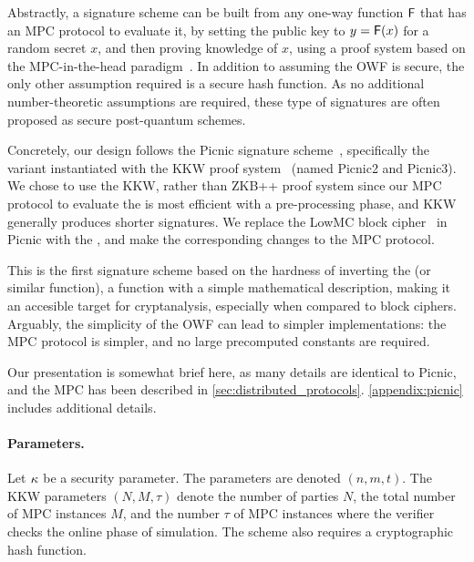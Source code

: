 Abstractly, a signature scheme can be built from any one-way function $\mathsf{F}$
that has an MPC protocol to evaluate it, by setting the public key to $y =
\mathsf{F}(x)$ for a random secret $x$, and then proving knowledge of $x$, using a
proof system based on the MPC-in-the-head paradigm~\cite{ishai2007-zkmpc}.  In
addition to assuming the OWF is secure, the only other assumption required is a
secure hash function. As no additional number-theoretic assumptions are
required, these type of signatures are often proposed as secure post-quantum
schemes. 

Concretely, our design follows the Picnic signature scheme~\cite{chase2017-picnic},
specifically the variant instantiated with the KKW proof
system~\cite{katz2018-pqsigs} (named Picnic2 and Picnic3).  We chose to use the
KKW, rather than ZKB++ proof system since our MPC protocol to evaluate the
\ttOWF is most efficient with a pre-processing phase, and KKW generally
produces shorter signatures.  We replace the LowMC block cipher~\cite{albrecht2015-lowmc} in Picnic 
with the \ttOWF, and make the corresponding changes to the MPC protocol. 

This is the first signature scheme based on the hardness of inverting the
\ttOWF (or similar function), a function with a simple mathematical
description, making it an accesible target for cryptanalysis, especially when
compared to block ciphers.  Arguably, the simplicity of the OWF can lead to
simpler implementations: the MPC protocol is simpler, and no large precomputed
constants are required. 

Our presentation is somewhat brief here, as many details are identical to Picnic, 
and the \ttOWF MPC has been described in \cref{sec:distributed_protocols}. \cref{appendix:picnic}
includes additional details. 

\paragraph{Parameters.} Let $\kappa$ be a security parameter.  The
\ttOWF parameters are denoted $(n, m, t)$.  The KKW parameters $(N, M,
\tau)$ denote the number of parties $N$, the total number of MPC instances $M$,
and the number $\tau$ of MPC instances where the verifier checks the online
phase of simulation.  The scheme also requires a cryptographic hash function. 

